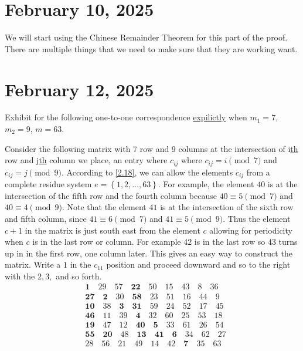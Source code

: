 \documentclass[11pt]{article}
\begin{document}
\section{February 10, 2025}
We will start using the Chinese Remainder Theorem for this part of the proof.
There are multiple things that we need to make sure that they are working want.
\section{February 12, 2025}
Exhibit for the following one-to-one correspondence \underline{expilictly} when \(m_1 = 7\), \(m_2 = 9\), \(m = 63\).
\begin{solution}
	Consider the following matrix with 7 row and 9 columns at the intersection of i\underline{th} row and j\underline{th} column we place, an entry where \(c_{ij}\) where \(c_{ij} = i \pmod{7}\) and \(c_{ij} = j \pmod{9}\). According to \cref{2.18}, we can allow the elements \(c_{ij}\) from a complete residue system \(e = \left\{1, 2, \ldots, 63\right\}\). For example, the element \(40\) is at the intersection of the fifth row and the fourth column because \(40 \equiv 5 \pmod{7}\) and \(40 \equiv 4 \pmod{9}\). Note that the element \(41\) is at the intersection of the sixth row and fifth column, since \(41 \equiv 6 \pmod{7}\) and \(41 \equiv 5 \pmod{9}\). Thus the element \(c + 1\) in the matrix is just south east from the element \(c\) allowing for periodicity when \(c\) is in the last row or column. For example \(42\) is in the last row so \(43\) turns up in in the first row, one column later. This gives an easy way to construct the matrix. Write a \(1\) in the \(c_11\) position and proceed downward and so to the right with the \(2, 3,\) and so forth.
	\[
		\begin{aligned}
			 & \mathbf{1} \quad 29 \quad 57 \quad \mathbf{22} \quad 50 \quad 15 \quad 43 \quad 8 \quad 36                             \\
			 & \mathbf{27} \quad \mathbf{2} \quad 30 \quad \mathbf{58} \quad 23 \quad 51 \quad 16 \quad 44 \quad 9                    \\
			 & \mathbf{10} \quad 38 \quad \mathbf{3} \quad \mathbf{31} \quad 59 \quad 24 \quad 52 \quad 17 \quad 45                   \\
			 & \mathbf{46} \quad 11 \quad 39 \quad \mathbf{4} \quad 32 \quad 60 \quad 25 \quad 53 \quad 18                            \\
			 & \mathbf{19} \quad 47 \quad 12 \quad \mathbf{40} \quad \mathbf{5} \quad 33 \quad 61 \quad 26 \quad 54                   \\
			 & \mathbf{55} \quad \mathbf{20} \quad 48 \quad \mathbf{13} \quad \mathbf{41} \quad \mathbf{6} \quad 34 \quad 62 \quad 27 \\
			 & 28 \quad 56 \quad 21 \quad 49 \quad 14 \quad 42 \quad \mathbf{7} \quad 35 \quad 63                                     \\
		\end{aligned}
	\]


\end{solution}
\end{document}
